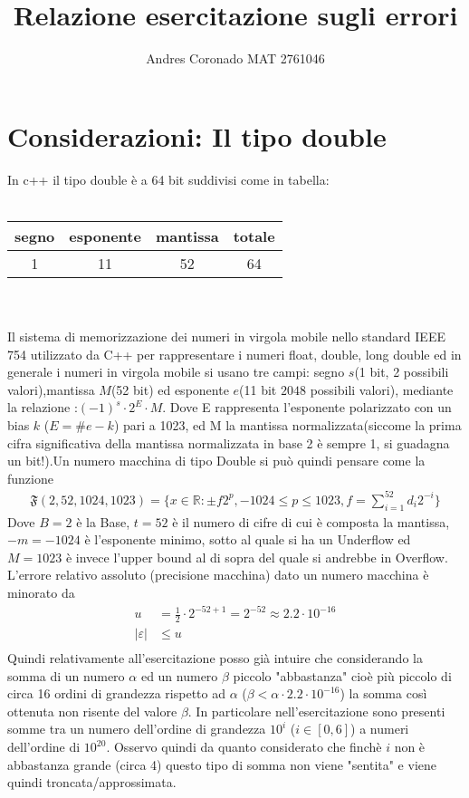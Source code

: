 \documentclass[10pt,a4paper]{article}
\author{Andres Coronado MAT 2761046}
\title{Relazione esercitazione sugli errori}
\begin{document}
\maketitle
\section{Considerazioni: Il tipo double}
In c++ il tipo double \`e a 64 bit suddivisi come in tabella:\\ \\
\begin{tabular}{|c|c|c|c|}
\hline 
segno & esponente & mantissa & totale \\ 
\hline 
1 & 11 & 52 & 64 \\ 
\hline 
\end{tabular}
\\
\\
Il sistema di memorizzazione dei numeri in virgola mobile nello standard IEEE 754 utilizzato da C++ per rappresentare i numeri float, double, long double  ed in generale i numeri in virgola mobile si usano tre campi: segno $s$(1 bit, 2 possibili valori),mantissa $M$(52 bit) ed esponente $e$(11 bit $2048$ possibili valori), mediante la relazione :$(-1)^s\cdot 2^E \cdot M$. Dove E rappresenta l'esponente polarizzato con un bias $k$ ($E=\#e-k$) pari a 1023, ed M la mantissa normalizzata(siccome la prima cifra significativa della mantissa normalizzata in base 2 \`e sempre 1, si guadagna un bit!).Un numero macchina di tipo Double si pu\`o quindi pensare come la funzione
\begin{align*}
\mathfrak{F}(2,52,1024,1023)=\{x \in \mathbb{R} : \pm f2^p,-1024\leq p \leq 1023,f=\sum_{i=1}^{52}d_i2^{-i}\}
\end{align*}
Dove $B=2$ \`e la Base, $t=52$ \`e il numero di cifre di cui \`e composta la mantissa, $-m=-1024$ \`e l'esponente minimo, sotto al quale si ha un Underflow ed $M=1023$ \`e invece l'upper bound al di sopra del quale si andrebbe in Overflow.\\
L'errore relativo assoluto (precisione macchina) dato un numero macchina \`e minorato da
\begin{align*}
u&=\frac{1}{2}\cdot 2^{-52+1}=2^{-52} \approx 2.2 \cdot 10^{-16}\\
|\varepsilon|&\leq u\\
\end{align*}
Quindi relativamente all'esercitazione posso gi\`a intuire che considerando la somma di un numero $\alpha$ ed un numero $\beta$ piccolo "abbastanza" cio\`e pi\`u piccolo di circa 16 ordini di grandezza rispetto ad $\alpha$ ($\beta < \alpha \cdot 2.2\cdot10^{-16}$) la somma cos\`i ottenuta non risente del valore $\beta$. In particolare nell'esercitazione sono presenti somme tra un numero dell'ordine di grandezza $10^i$ ($i \in [0,6]$) a numeri dell'ordine di $10^{20}$. Osservo quindi da quanto  considerato che finch\`e $i$ non \`e abbastanza grande (circa 4) questo tipo di somma non viene "sentita" e viene quindi troncata/approssimata. 
\end{document}
